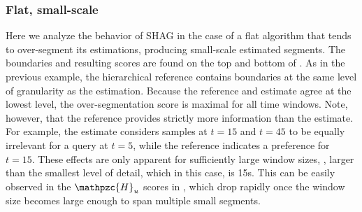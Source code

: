 \documentclass{article}
\def\shag{\ensuremath{\mathpzc{H}}}
\begin{document}
\subsubsection{Flat, small-scale}

Here we analyze the behavior of SHAG in the case of a flat algorithm that tends to over-segment its estimations, producing small-scale estimated segments.
The boundaries and resulting scores are found on the top and bottom of .
As in the previous example, the hierarchical reference contains boundaries at the same level of granularity as the estimation. 
Because the reference and estimate agree at the lowest level, the over-segmentation score is maximal for all time windows.
Note, however, that the reference provides strictly more information than the estimate.  For example, the estimate considers samples at $t=15$ and $t=45$ to be equally irrelevant for a 
query at $t=5$, while the reference indicates a preference for $t=15$.  These effects are only apparent for sufficiently large window sizes, \eg, larger than the smallest level of
detail, which in this case, is 15s.  This can be easily observed in the $\shag_u$
scores in , which drop rapidly once the window size becomes
large enough to span multiple small segments.
\end{document}
